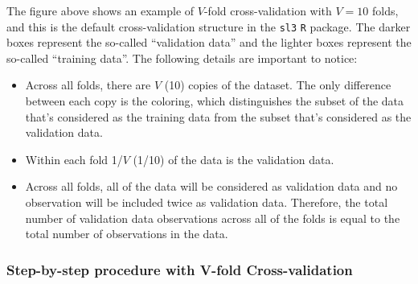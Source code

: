 \documentclass[
  12pt, krantz2,
]{krantz}
\newcommand{\passthrough}[1]{#1}
\providecommand{\tightlist}{%
  \setlength{\itemsep}{0pt}\setlength{\parskip}{0pt}}
\theoremstyle{definition}
\theoremstyle{definition}
\theoremstyle{definition}
\newcommand{\1}{\mathbbm{1}}
\begin{document}
The figure above shows an example of \(V\)-fold cross-validation with \(V=10\)
folds, and this is the default cross-validation structure in the \passthrough{\lstinline!sl3!} \passthrough{\lstinline!R!}
package. The darker boxes represent the so-called ``validation data'' and the
lighter boxes represent the so-called ``training data''. The following details
are important to notice:

\begin{itemize}
\tightlist
\item
  Across all folds, there are \(V\) (10) copies of the dataset. The only
  difference between each copy is the coloring, which distinguishes the subset
  of the data that's considered as the training data from the subset that's
  considered as the validation data.
\item
  Within each fold 1/\(V\) (1/10) of the data is the validation data.
\item
  Across all folds, all of the data will be considered as validation data and
  no observation will be included twice as validation data. Therefore, the
  total number of validation data observations across all of the folds is
  equal to the total number of observations in the data.
\end{itemize}

\hypertarget{step-by-step-procedure-with-v-fold-cross-validation}{%
\subsubsection{Step-by-step procedure with V-fold Cross-validation}\label{step-by-step-procedure-with-v-fold-cross-validation}}
\end{document}
